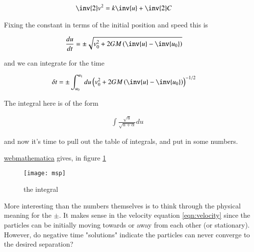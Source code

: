 \documentclass{article}
\begin{document}
\begin{align*}
\inv{2}v^2 &= k \inv{u} + \inv{2}C
\end{align*}

Fixing the constant in terms of the initial position and speed this is

\begin{align}\label{eqn:velocity}
\frac{du}{dt} &= \pm \sqrt{v_0^2 + 2 G M \left(\inv{u} - \inv{u_0}\right)}
\end{align}

and we can integrate for the time

\begin{align*}
\delta t &= \pm \int_{u_0}^{u_1} du \left(v_0^2 + 2 G M \left(\inv{u} - \inv{u_0}\right)\right)^{-1/2}
\end{align*}

The integral here is of the form

\begin{align*}
\int \frac{\sqrt{u}}{\sqrt{u + \alpha}} du
\end{align*}

and now it's time to pull out the table of integrals, and put in some numbers.

\href{http://calc101.com/webMathematica/integrals.jsp}{webmathematica} gives, in figure \ref{fig:msp}

\begin{figure}[htp]
\centering
\texttt{[image: msp]}
\caption{the integral}\label{fig:msp}
\end{figure}

More interesting than the numbers themselves is to think through the physical meaning for the $\pm$.  It makes sense in the velocity equation \ref{eqn:velocity} since the particles can be initially moving towards or away from each other (or stationary).  However, do negative time "solutions" indicate the particles can never converge to the desired separation?

%
%
\end{document}
